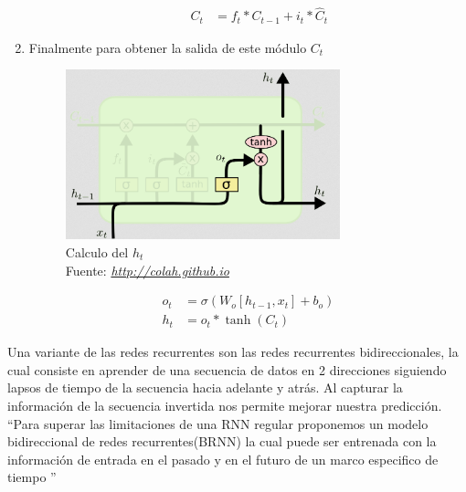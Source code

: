 \begin{enumerate}
\begin{enumerate}
\begin{equation}
\begin{aligned}
				C_{t}&=f_{t}\ast C_{t-1} + i_{t}\ast \hat{C}_{t}
		    \end{aligned}
		\end{equation}
	\end{enumerate}
\item Finalmente para obtener la salida de este módulo $C_{t}$
		\begin{figure}[H]
	\centering
	\includegraphics[width=0.75\textwidth]{Figures/LSTM9.png}
	\caption{Calculo del $h_{t}$ \\ Fuente:  \href{http://colah.github.io/posts/2015-08-Understanding-LSTMs/}{\textit{http://colah.github.io}}}
	\label{}
\end{figure}
		\begin{equation}
			\label{ht}
			\begin{aligned}
				o_{t}&=\sigma(W_{o}[h_{t-1},x_{t}]+b_{o})\\
				h_{t}&=o_{t}\ast \tanh(C_{t})
			\end{aligned}
		\end{equation}
\end{enumerate}

\newpage
Una variante de las redes recurrentes son las redes recurrentes bidireccionales, la cual consiste en aprender de una secuencia de datos en 2 direcciones siguiendo lapsos de tiempo de la secuencia hacia adelante y atrás. Al capturar la información de la secuencia invertida nos permite mejorar nuestra predicción.	\textquotedblleft Para superar las limitaciones de una RNN regular proponemos un modelo bidireccional de redes recurrentes(BRNN) la cual puede ser entrenada con la información de entrada en el pasado y en el futuro de un marco especifico de tiempo \textquotedblright \cite{BRNN}





